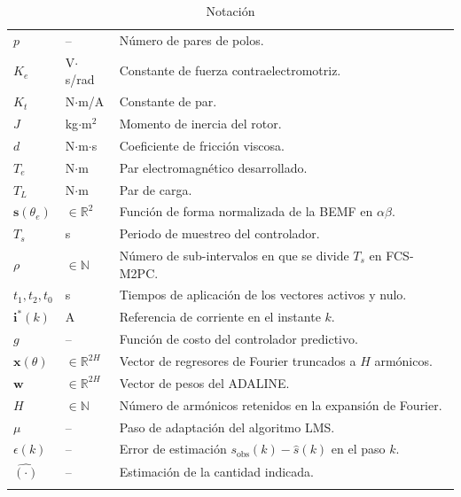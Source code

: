 \documentclass[../Tesis_JALS_Maestria.tex]{subfiles}
\begin{document}
{\begin{longtable}{
		>{\centering\arraybackslash}p{3cm}
		>{\centering\arraybackslash}p{4cm}
		p{8cm}
	}
	$p$ & -- & Número de pares de polos. \\

	$K_e$ & V$\cdot$s/rad & Constante de fuerza contraelectromotriz. \\

	$K_t$ & N$\cdot$m/A & Constante de par. \\

	$J$ & kg$\cdot$m$^2$ & Momento de inercia del rotor. \\

	$d$ & N$\cdot$m$\cdot$s & Coeficiente de fricción viscosa. \\

	$T_e$ & N$\cdot$m & Par electromagnético desarrollado. \\

	$T_L$ & N$\cdot$m & Par de carga. \\

	$\mathbf{s}(\theta_e)$ & $\in\mathbb{R}^2$ & Función de forma normalizada de la BEMF en $\alpha\beta$. \\

	$T_s$ & s & Periodo de muestreo del controlador. \\

	$\rho$ & $\in\mathbb{N}$ & Número de sub-intervalos en que se divide $T_s$ en FCS-M2PC. \\

	$t_1, t_2, t_0$ & s & Tiempos de aplicación de los vectores activos y nulo. \\

	$\mathbf{i}^*(k)$ & A & Referencia de corriente en el instante $k$. \\

	$g$ & -- & Función de costo del controlador predictivo. \\

	$\mathbf{x}(\theta)$ & $\in\mathbb{R}^{2H}$ & Vector de regresores de Fourier truncados a $H$ armónicos. \\

	$\mathbf{w}$ & $\in\mathbb{R}^{2H}$ & Vector de pesos del ADALINE. \\

	$H$ & $\in\mathbb{N}$ & Número de armónicos retenidos en la expansión de Fourier. \\

	$\mu$ & -- & Paso de adaptación del algoritmo LMS. \\

	$\epsilon(k)$ & -- & Error de estimación $s_{\mathrm{obs}}(k) - \hat{s}(k)$ en el paso $k$. \\

	$\hat{(\cdot)}$ & -- & Estimación de la cantidad indicada. \\

	\caption[Not]{Notación}
	\label{Tab:Notacion}\\
\end{longtable}
}
\end{document}
